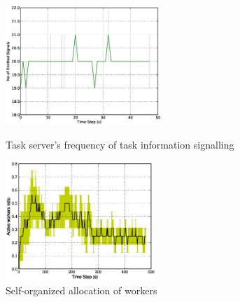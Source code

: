 \documentclass{llncs}
\begin{document}
\begin{figure}
\begin{minipage}[t]{0.48\linewidth}
\centering
\includegraphics[height=4.5cm, angle=0]
{images/Global-SignalingFreqStat.eps}
\caption{\small Task server's frequency of task information signalling}
\label{fig:signal-frequency-stat}
%
\end{minipage}
\hspace{0.5cm}
\begin{minipage}[t]{0.48\linewidth}
\centering
\includegraphics[height=4.5cm, angle=0]{images/WorkerRatio.eps}
\caption{\small Self-organized allocation of workers }
\label{fig:worker-stat} %
\end{minipage}
\end{figure}
\end{document}
